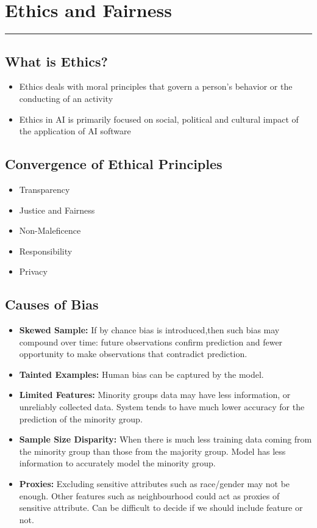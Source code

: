 \documentclass[11pt]{article}
\begin{document}
\pagebreak

\section{Ethics and Fairness}
\hrule \vspace{15pt}

\subsection{What is Ethics?}
\begin{itemize}
\item Ethics deals with moral principles that govern a person's behavior or the conducting of an activity
\item Ethics in AI is primarily focused on social, political and cultural impact of the application of AI software
\end{itemize}
\subsection{Convergence of Ethical Principles}
\begin{itemize}
\item Transparency
\item Justice and Fairness 
\item Non-Maleficence
\item Responsibility
\item Privacy
\end{itemize}
\subsection{Causes of Bias}
\begin{itemize}
\item \textbf{Skewed Sample:} If by chance bias is introduced,then such bias may compound over time: future observations confirm prediction and fewer opportunity to make observations that contradict prediction. 
\item \textbf{Tainted Examples: }Human bias can be captured by the model.
\item \textbf{Limited Features: }Minority groups data may have less information, or unreliably collected data. System tends to have much lower accuracy for the prediction of the minority group.
\item \textbf{Sample Size Disparity: }When there is much less training data coming from the minority group than those from the majority group. Model has less information to accurately model the minority group.
\item \textbf{Proxies:} Excluding sensitive attributes such as race/gender may not be enough. Other features such as neighbourhood could act as proxies of sensitive attribute. Can be difficult to decide if we should include feature or not. 
\end{itemize}
\end{document}
